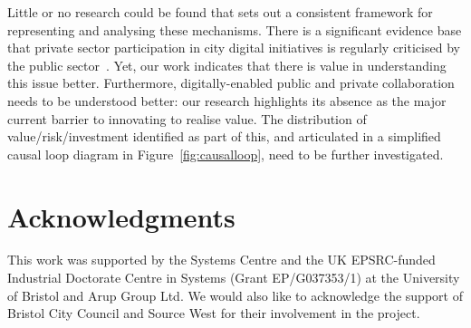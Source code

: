\documentclass[b5paper,10pt]{article}
\begin{document}
Little or no research could be found that sets out a consistent
framework for representing and analysing these mechanisms. There is a
significant evidence base that private sector participation in city
digital initiatives is regularly criticised by the public
sector~\citep{martin:2016}. Yet, our work indicates that there is
value in understanding this issue better. Furthermore,
digitally-enabled public and private collaboration needs to be
understood better: our research highlights its absence as the major
current barrier to innovating to realise value. The distribution of
value/risk/investment identified as part of this, and articulated in a
simplified causal loop diagram in Figure~\ref{fig:causalloop}, need to
be further investigated.

\section*{Acknowledgments}

This work was supported by the Systems Centre and the UK EPSRC-funded
Industrial Doctorate Centre in Systems (Grant EP/G037353/1) at the
University of Bristol and Arup Group Ltd. We would also like to
acknowledge the support of Bristol City Council and Source West for
their involvement in the project.




\end{document}
